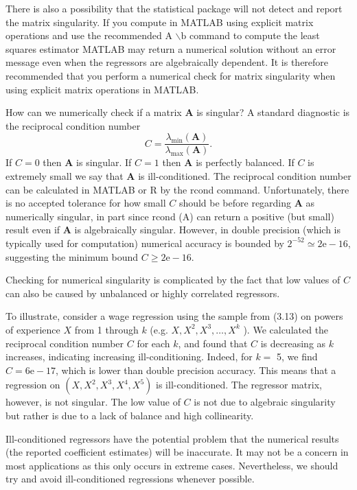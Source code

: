 \documentclass[10pt]{article}
\begin{document}
There is also a possibility that the statistical package will not detect and report the matrix singularity. If you compute in MATLAB using explicit matrix operations and use the recommended A $\backslash \mathrm{b}$ command to compute the least squares estimator MATLAB may return a numerical solution without an error message even when the regressors are algebraically dependent. It is therefore recommended that you perform a numerical check for matrix singularity when using explicit matrix operations in MATLAB.

How can we numerically check if a matrix $\boldsymbol{A}$ is singular? A standard diagnostic is the reciprocal condition number
$$
C=\frac{\lambda_{\min }(\boldsymbol{A})}{\lambda_{\max }(\boldsymbol{A})} .
$$
If $C=0$ then $\boldsymbol{A}$ is singular. If $C=1$ then $\boldsymbol{A}$ is perfectly balanced. If $C$ is extremely small we say that $\boldsymbol{A}$ is ill-conditioned. The reciprocal condition number can be calculated in MATLAB or R by the rcond command. Unfortunately, there is no accepted tolerance for how small $C$ should be before regarding $\boldsymbol{A}$ as numerically singular, in part since rcond (A) can return a positive (but small) result even if $\boldsymbol{A}$ is algebraically singular. However, in double precision (which is typically used for computation) numerical accuracy is bounded by $2^{-52} \simeq 2 \mathrm{e}-16$, suggesting the minimum bound $C \geq 2 \mathrm{e}-16$.

Checking for numerical singularity is complicated by the fact that low values of $C$ can also be caused by unbalanced or highly correlated regressors.

To illustrate, consider a wage regression using the sample from (3.13) on powers of experience $X$ from 1 through $k$ (e.g. $X, X^{2}, X^{3}, \ldots, X^{k}$ ). We calculated the reciprocal condition number $C$ for each $k$, and found that $C$ is decreasing as $k$ increases, indicating increasing ill-conditioning. Indeed, for $k=$ 5, we find $C=6 \mathrm{e}-17$, which is lower than double precision accuracy. This means that a regression on $\left(X, X^{2}, X^{3}, X^{4}, X^{5}\right)$ is ill-conditioned. The regressor matrix, however, is not singular. The low value of $C$ is not due to algebraic singularity but rather is due to a lack of balance and high collinearity.

Ill-conditioned regressors have the potential problem that the numerical results (the reported coefficient estimates) will be inaccurate. It may not be a concern in most applications as this only occurs in extreme cases. Nevertheless, we should try and avoid ill-conditioned regressions whenever possible.
\end{document}
